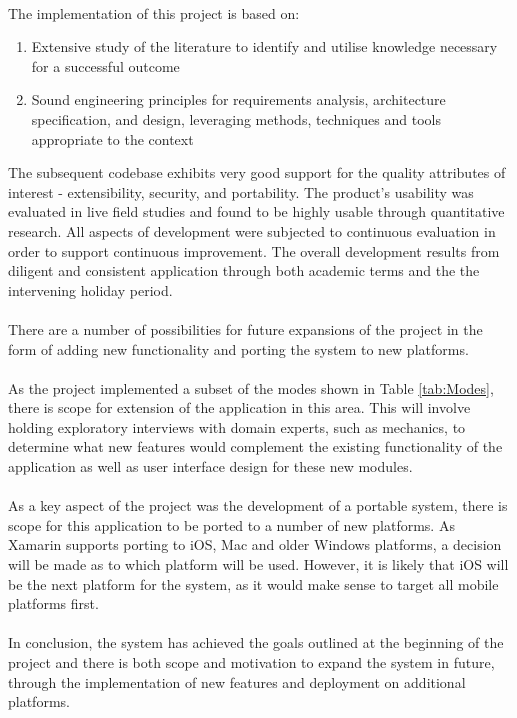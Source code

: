 	\paragraph{}{
	The implementation of this project is based on:
	\begin{enumerate}
		\item Extensive study of the literature to identify and utilise knowledge necessary for a successful outcome
		\item Sound engineering principles for requirements analysis, architecture specification, and design, leveraging methods, techniques and tools appropriate to the context
	\end{enumerate}
	
	The subsequent codebase exhibits very good support for the quality attributes of interest - extensibility, security, and portability. The product's usability was evaluated in live field studies and found to be highly usable through quantitative research. All aspects of development were subjected to continuous evaluation in order to support continuous improvement. The overall development results from diligent and consistent application through both academic terms and the the intervening holiday period.
	}

	\paragraph{}{
	There are a number of possibilities for future expansions of the project in the form of adding new functionality and porting the system to new platforms.
	}
			
	\paragraph{}{
	As the project implemented a subset of the modes shown in Table \ref{tab:Modes}, there is scope for extension of the application in this area. This will involve holding exploratory interviews with domain experts, such as mechanics, to determine what new features would complement the existing functionality of the application as well as user interface design for these new modules.
	}
	
	\paragraph{}{
	As a key aspect of the project was the development of a portable system, there is scope for this application to be ported to a number of new platforms. As Xamarin supports porting to iOS, Mac and older Windows platforms, a decision will be made as to which platform will be used. However, it is likely that iOS will be the next platform for the system, as it would make sense to target all mobile platforms first.
	}
	\paragraph{}{
	In conclusion, the system has achieved the goals outlined at the beginning of the project and there is both scope and motivation to expand the system in future, through the implementation of new features and deployment on additional platforms.
	}